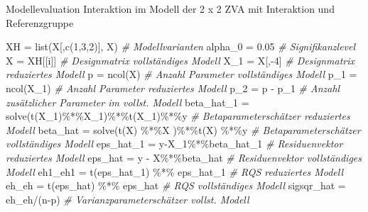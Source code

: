 \documentclass[
  8pt,
  ignorenonframetext,
]{beamer}
\newenvironment{Shaded}{\begin{snugshade}}{\end{snugshade}}
\newcommand{\CommentTok}[1]{\textcolor[rgb]{0.56,0.35,0.01}{\textit{#1}}}
\newcommand{\DecValTok}[1]{\textcolor[rgb]{0.00,0.00,0.81}{#1}}
\newcommand{\FloatTok}[1]{\textcolor[rgb]{0.00,0.00,0.81}{#1}}
\newcommand{\FunctionTok}[1]{\textcolor[rgb]{0.00,0.00,0.00}{#1}}
\newcommand{\NormalTok}[1]{#1}
\newcommand{\OtherTok}[1]{\textcolor[rgb]{0.56,0.35,0.01}{#1}}
\newcommand{\SpecialCharTok}[1]{\textcolor[rgb]{0.00,0.00,0.00}{#1}}
\begin{document}
\begin{frame}[fragile]{\small Modellevaluation \textbar{} Interaktion im
Modell der 2 x 2 ZVA mit Interaktion und Referenzgruppe}
\begin{Shaded}
\begin{Highlighting}[]
\NormalTok{XH         }\OtherTok{=} \FunctionTok{list}\NormalTok{(X[,}\FunctionTok{c}\NormalTok{(}\DecValTok{1}\NormalTok{,}\DecValTok{3}\NormalTok{,}\DecValTok{2}\NormalTok{)], X)                       }\CommentTok{\# Modellvarianten}
\NormalTok{alpha\_0    }\OtherTok{=} \FloatTok{0.05}                                        \CommentTok{\# Signifikanzlevel}
\NormalTok{X          }\OtherTok{=}\NormalTok{ XH[[i]]                                     }\CommentTok{\# Designmatrix vollständiges Modell}
\NormalTok{X\_1        }\OtherTok{=}\NormalTok{ X[,}\SpecialCharTok{{-}}\DecValTok{4}\NormalTok{]                                      }\CommentTok{\# Designmatrix reduziertes Modell}
\NormalTok{p          }\OtherTok{=} \FunctionTok{ncol}\NormalTok{(X)                                     }\CommentTok{\# Anzahl Parameter vollständiges Modell}
\NormalTok{p\_1        }\OtherTok{=} \FunctionTok{ncol}\NormalTok{(X\_1)                                   }\CommentTok{\# Anzahl Parameter reduziertes Modell}
\NormalTok{p\_2        }\OtherTok{=}\NormalTok{ p }\SpecialCharTok{{-}}\NormalTok{ p\_1                                     }\CommentTok{\# Anzahl zusätzlicher Parameter im vollst. Modell}
\NormalTok{beta\_hat\_1 }\OtherTok{=} \FunctionTok{solve}\NormalTok{(}\FunctionTok{t}\NormalTok{(X\_1)}\SpecialCharTok{\%*\%}\NormalTok{X\_1)}\SpecialCharTok{\%*\%}\FunctionTok{t}\NormalTok{(X\_1)}\SpecialCharTok{\%*\%}\NormalTok{y            }\CommentTok{\# Betaparameterschätzer reduziertes Modell}
\NormalTok{beta\_hat   }\OtherTok{=} \FunctionTok{solve}\NormalTok{(}\FunctionTok{t}\NormalTok{(X) }\SpecialCharTok{\%*\%}\NormalTok{X )}\SpecialCharTok{\%*\%}\FunctionTok{t}\NormalTok{(X) }\SpecialCharTok{\%*\%}\NormalTok{y               }\CommentTok{\# Betaparameterschätzer vollständiges Modell}
\NormalTok{eps\_hat\_1  }\OtherTok{=}\NormalTok{ y}\SpecialCharTok{{-}}\NormalTok{X\_1}\SpecialCharTok{\%*\%}\NormalTok{beta\_hat\_1                          }\CommentTok{\# Residuenvektor reduziertes Modell}
\NormalTok{eps\_hat    }\OtherTok{=}\NormalTok{ y }\SpecialCharTok{{-}}\NormalTok{ X}\SpecialCharTok{\%*\%}\NormalTok{beta\_hat                            }\CommentTok{\# Residuenvektor vollständiges Modell}
\NormalTok{eh1\_eh1    }\OtherTok{=} \FunctionTok{t}\NormalTok{(eps\_hat\_1) }\SpecialCharTok{\%*\%}\NormalTok{ eps\_hat\_1                  }\CommentTok{\# RQS reduziertes Modell}
\NormalTok{eh\_eh      }\OtherTok{=} \FunctionTok{t}\NormalTok{(eps\_hat) }\SpecialCharTok{\%*\%}\NormalTok{ eps\_hat                      }\CommentTok{\# RQS vollständiges Modell}
\NormalTok{sigsqr\_hat }\OtherTok{=}\NormalTok{ eh\_eh}\SpecialCharTok{/}\NormalTok{(n}\SpecialCharTok{{-}}\NormalTok{p)                                 }\CommentTok{\# Varianzparameterschätzer vollst. Modell}

\end{Highlighting}
\end{Shaded}
\end{frame}
\end{document}
